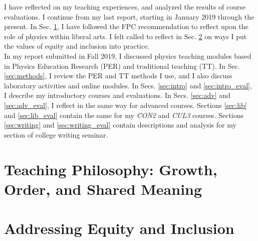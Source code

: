 \documentclass[../../main.tex]{subfiles}
\begin{document}
\label{sec:teaching}

I have reflected on my teaching experiences, and analyzed the results of course evaluations.  I continue from my last report, starting in January 2019 through the present.  In Sec. \ref{sec:teaching_philosophy}, I have followed the FPC recommendation to reflect upon the role of physics within liberal arts.  I felt called to reflect in Sec. \ref{sec:equity_inclusion} on ways I put the values of equity and inclusion into practice.
\\
\vspace{0.15cm}
In my report submitted in Fall 2019, I discussed physics teaching modules based in Physics Education Research (PER) and traditional teaching (TT).  In Sec. \ref{sec:methods}, I review the PER and TT methods I use, and I also discuss laboratory activities and online modules.  In Secs. \ref{sec:intro} and \ref{sec:intro_eval}, I describe my introductory courses and evaluations.  In Secs. \ref{sec:adv} and \ref{sec:adv_eval}, I reflect in the same way for advanced courses.  Sections \ref{sec:lib} and \ref{sec:lib_eval} contain the same for my \textit{CON2} and \textit{CUL3} courses.  Sections \ref{sec:writing} and \ref{sec:writing_eval} contain descriptions and analysis for my section of college writing seminar.

\section{Teaching Philosophy: Growth, Order, and Shared Meaning}
\label{sec:teaching_philosophy}

\begin{flushleft}

\end{flushleft}

\section{Addressing Equity and Inclusion}
\label{sec:equity_inclusion}

\begin{flushleft}

\end{flushleft}

%
%
\end{document}
